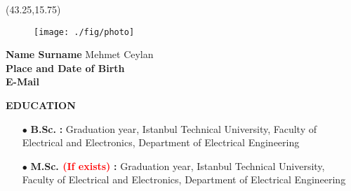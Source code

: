 \vspace*{10mm}
\setlength{\TPHorizModule}{10pt}
\setlength{\TPVertModule}{10pt}
\begin{textblock}{1}(43.25,15.75) %
	\begin{figure}[p]
		\texttt{[image: ./fig/photo]}
	\end{figure}	
\end{textblock}
\vspace*{20mm}
\textbf{Name Surname\makebox[2.155cm]{\hfill \textbf{:}}}\hspace{0.225em} Mehmet Ceylan \\ %

\textbf{Place and Date of Birth\makebox[0.735cm]{\hfill \textbf{:}}}\hspace{0.225em} \\ %

\textbf{E-Mail\makebox[3.685cm]{\hfill \textbf{:}}}\hspace{0.225em} \\ %

\vspace{5mm}

\renewcommand\labelitemi{\normalsize$\bullet$} 			%

\textbf{EDUCATION\makebox[2.41cm]{\hfill \textbf{:}}}  	%
\vspace{-3mm}

\begin{itemize}[leftmargin=5.15cm,itemsep=-0.25em,labelsep=2mm] %
	\item [$\bullet$ \hspace{1em}\textbf{B.Sc.} \hspace{6.85em} \textbf{:}] Graduation year, Istanbul Technical University, Faculty of Electrical and Electronics, Department of Electrical Engineering
	\item [$\bullet$ \hspace{1em}\textbf{M.Sc. \textcolor{red}{(If exists)}} \hspace{2.4em} \textbf{:}] Graduation year, Istanbul Technical University, Faculty of Electrical and Electronics, Department of Electrical Engineering
\end{itemize}

